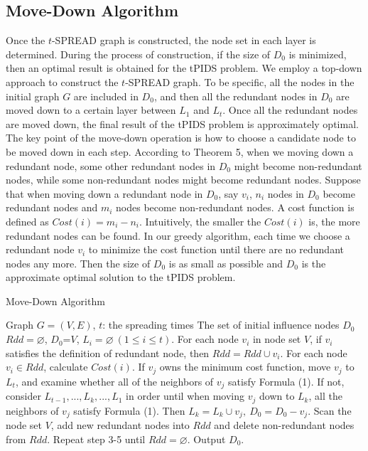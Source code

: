 \subsection{Move-Down Algorithm}
Once the $t$-SPREAD graph is constructed, the node set in each layer is determined. During the process of construction, if the size of $D_0$ is minimized, then an optimal result is obtained for the tPIDS problem.
We employ a top-down approach to construct the $t$-SPREAD graph. To be specific, all the nodes in the initial graph $G$ are included in $D_0$, and then all the redundant nodes in $D_0$ are moved down to a certain layer between $L_1$ and $L_t$. Once all the redundant nodes are moved down, the final result of the tPIDS problem is approximately optimal. The key point of the move-down operation is how to choose a candidate node to be moved down in each step.
According to Theorem 5, when we moving down a redundant node, some other redundant nodes in $D_0$ might become non-redundant nodes, while some non-redundant nodes might become redundant nodes. Suppose that when moving down a redundant node in $D_0$, say $v_i$, $n_i$ nodes in $D_0$ become redundant nodes and $m_i$ nodes become non-redundant nodes. A cost function is defined as 
$Cost(i) = m_i - n_i.$
Intuitively, the smaller the $Cost(i)$ is, the more redundant nodes can be found. 
In our greedy algorithm, each time we choose a redundant node $v_i$ to minimize the cost function until there are no redundant nodes any more.
Then the size of $D_0$ is as small as possible and $D_0$ is the approximate optimal solution to the tPIDS problem.\\
\begin{algorithm}[!htb]
	\label{alg1}
	\caption{Move-Down Algorithm}
	\begin{algorithmic}[1] %
		\Require Graph $G=(V,E)$, $t$: the spreading times
		\Ensure The set of initial influence nodes $D_0$
		\State  $Rdd=\varnothing$, $D_0$=$V$, $ L_i= \varnothing ~(1\leqslant i\leqslant t)$.
		\State For each node $v_i$ in node set $V$, if $v_i$ satisfies the definition of redundant node, then $ Rdd=Rdd \cup v_i $.
		\State For each node $ v_i \in Rdd $, calculate $Cost(i)$.
		\State If $v_j$ owns the minimum cost function, move $v_j$ to $L_t$, and examine whether all of the neighbors of $v_j$ satisfy Formula (1). If not, consider $L_{t-1},...,L_k,...,L_1$ in order until when moving $v_j$ down to $L_k$, all the neighbors of $v_j$ satisfy Formula (1). Then $L_k=L_k \cup {v_j},~D_0=D_0-v_j$.
		\State Scan the node set $V$, add new redundant nodes into $Rdd$ and delete non-redundant nodes from $Rdd$.
		\State Repeat step 3-5 until $Rdd=\varnothing$.
		\State Output $D_0$.
	\end{algorithmic}
\end{algorithm}
